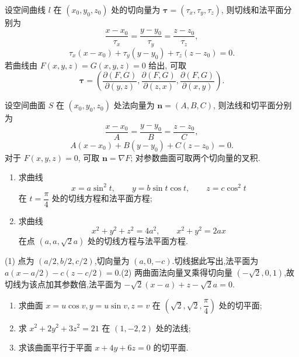 \begin{proposition}[\markstar]
    设空间曲线 $l$ 在 $(x_0,y_0,z_0)$ 处的切向量为 $\bm\tau=(\tau_x,\tau_y,\tau_z)$, 则切线和法平面分别为
    \[
        \dfrac{x-x_0}{\tau_x}=\dfrac{y-y_0}{\tau_y}=\dfrac{z-z_0}{\tau_z},
    \]
    \[
        \tau_x(x-x_0)+\tau_y(y-y_0)+\tau_z(z-z_0)=0.
    \]
    若曲线由 $F(x,y,z)=G(x,y,z)=0$ 给出, 可取
    \[
        \bm\tau=
        \left(
        \dfrac{\partial(F,G)}{\partial(y,z)},
        \dfrac{\partial(F,G)}{\partial(z,x)},
        \dfrac{\partial(F,G)}{\partial(x,y)}
        \right).
    \]
\end{proposition}

\begin{proposition}[\markstar]
    设空间曲面 $S$ 在 $(x_0,y_0,z_0)$ 处法向量为 $\bm n=(A,B,C)$, 则法线和切平面分别为
    \[
        \dfrac{x-x_0}{A}=\dfrac{y-y_0}{B}=\dfrac{z-z_0}{C},
    \]
    \[
        A(x-x_0)+B(y-y_0)+C(z-z_0)=0.
    \]
    对于 $F(x,y,z)=0$, 可取 $\bm n=\nabla F$; 对参数曲面可取两个切向量的叉积.
\end{proposition}

\begin{example}
    \begin{enumerate}
        \item 求曲线
              \[
                  x=a\sin^2t,\qquad y=b\sin t\cos t,\qquad z=c\cos^2t
              \]
              在 $t=\dfrac{\pi}{4}$ 处的切线方程和法平面方程;
        \item 求曲线
              \[
                  x^2+y^2+z^2=4a^2,\qquad x^2+y^2=2ax
              \]
              在点 $(a,a,\sqrt2a)$ 处的切线方程与法平面方程.
    \end{enumerate}
\end{example}
\exampleblank

\begin{solution}
    (1) 点为 $(a/2,b/2,c/2)$,切向量为 $(a,0,-c)$.切线据此写出,法平面为 $a(x-a/2)-c(z-c/2)=0$.(2) 两曲面法向量叉乘得切向量 $(-\sqrt{2},0,1)$,故切线为该点加其参数倍,法平面为 $-\sqrt{2}(x-a)+z-\sqrt{2}a=0$.
\end{solution}

\begin{example}
    \begin{enumerate}
        \item 求曲面 $x=u\cos v,y=u\sin v,z=v$ 在 $(\sqrt{2},\sqrt{2},\dfrac{\pi}{4})$ 处的切平面;
        \item 求 $x^2+2y^2+3z^2=21$ 在 $(1,-2,2)$ 处的法线;
        \item 求该曲面平行于平面 $x+4y+6z=0$ 的切平面.
    \end{enumerate}
\end{example}
\exampleblank

